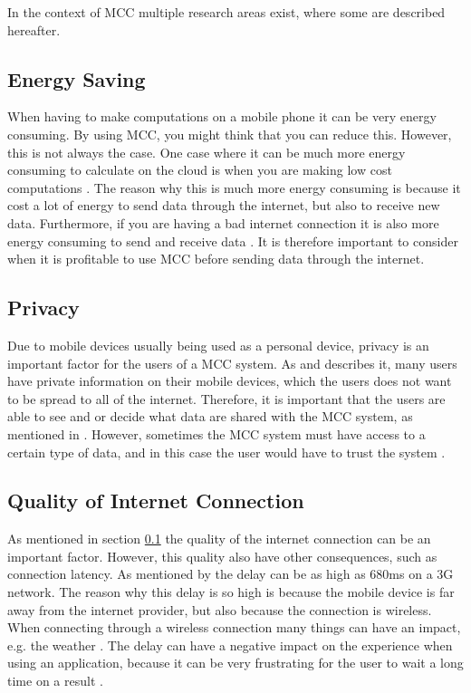 In the context of MCC multiple research areas exist, where some are described hereafter.
\subsection{Energy Saving}\label{EnergySaving}
When having to make computations on a mobile phone it can be very energy consuming.
By using MCC, you might think that you can reduce this.
However, this is not always the case.
One case where it can be much more energy consuming to calculate on the cloud is when you are making low cost computations \citep{goyalmobile,liu2013gearing,fernando2013mobile}.
The reason why this is much more energy consuming is because it cost a lot of energy to send data through the internet, but also to receive new data.
Furthermore, if you are having a bad internet connection it is also more energy consuming to send and receive data \citep{goyalmobile,liu2013gearing,fernando2013mobile}.
It is therefore important to consider when it is profitable to use MCC before sending data through the internet.

\subsection{Privacy}
Due to mobile devices usually being used as a personal device, privacy is an important factor for the users of a MCC system.
As \citet{liu2013gearing} and \citet{fernando2013mobile} describes it, many users have private information on their mobile devices, which the users does not want to be spread to all of the internet.
Therefore, it is important that the users are able to see and or decide what data are shared with the MCC system, as mentioned in \citet{sanaei2014heterogeneity}.
However, sometimes the MCC system must have access to a certain type of data, and in this case the user would have to trust the system \citep{fernando2013mobile}.

\subsection{Quality of Internet Connection}
As mentioned in section \ref{EnergySaving} the quality of the internet connection can be an important factor.
However, this quality also have other consequences, such as connection latency.
As mentioned by \citet{fernando2013mobile} the delay can be as high as 680ms on a 3G network.
The reason why this delay is so high is because the mobile device is far away from the internet provider, but also because the connection is wireless.
When connecting through a wireless connection many things can have an impact, e.g. the weather \citep{dev2014review,kumar2013mobile}.
The delay can have a negative impact on the experience when using an application, because it can be very frustrating for the user to wait a long time on a result \citep{hazarika2014mobile}.

